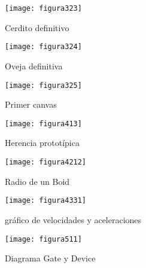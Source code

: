 \begin{figure}
\texttt{[image: figura323]}\\
\centering
\caption{Cerdito definitivo}
\label{fig:figura323}
\end{figure}


\begin{figure}
\texttt{[image: figura324]}\\
\centering
\caption{Oveja definitiva}
\label{fig:figura324}
\end{figure}


\begin{figure}
\texttt{[image: figura325]}
\centering
\caption{Primer canvas}
\label{fig:figura325}
\end{figure}


\begin{figure}
\texttt{[image: figura413]}\\
\centering
\caption{Herencia prototípica}
\label{fig:figura413}
\end{figure}


\begin{figure}
\texttt{[image: figura4212]}\\
\centering
\caption{Radio de un Boid}
\label{fig:figura4212}
\end{figure}

\begin{figure}
\texttt{[image: figura4331]}\\
\centering
\caption{gráfico de velocidades y aceleraciones}
\label{fig:lock}
\end{figure}
 


\begin{figure}
\texttt{[image: figura511]}\\
\centering
\caption{Diagrama Gate y Device}
\label{fig:figura511}
\end{figure}



